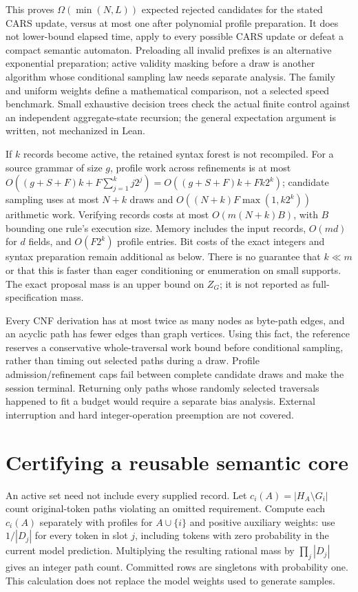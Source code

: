 \documentclass[11pt,a4paper]{article}
\begin{document}
This proves $\Omega(\min(N,L))$ expected rejected candidates for the stated
CARS update, versus at most one after polynomial profile preparation. It
does not lower-bound elapsed time, apply to every possible CARS update or
defeat a compact semantic automaton. Preloading all invalid prefixes is an
alternative exponential preparation; active validity masking before a draw
is another algorithm whose conditional sampling law needs separate analysis.
The family and uniform weights define a mathematical comparison, not a
selected speed benchmark. Small exhaustive decision trees check the actual
finite control against an independent aggregate-state recursion; the general
expectation argument is written, not mechanized in Lean.

If $k$ records become active, the retained syntax forest is not recompiled.
For a source grammar of size $g$, profile work across refinements is at most
$O((g+S+F)k+F\sum_{j=1}^k j2^j)=O((g+S+F)k+Fk2^k)$;
candidate sampling uses at most $N+k$ draws and
$O((N+k)F\max(1,k2^k))$ arithmetic work. Verifying records costs at most
$O(m(N+k)B)$, with $B$ bounding one rule's execution size. Memory includes
the input records, $O(md)$ for $d$ fields, and $O(F2^k)$ profile entries.
Bit costs of the exact integers and syntax preparation remain additional as
below. There is no guarantee that $k\ll m$ or that this is faster than eager
conditioning or enumeration on small supports. The exact proposal mass is
an upper bound on $Z_G$; it is not reported as full-specification mass.

Every CNF derivation has at most twice as many nodes as byte-path edges,
and an acyclic path has fewer edges than graph vertices. Using this fact,
the reference reserves a conservative whole-traversal work bound before
conditional sampling, rather than timing out selected paths during a draw.
Profile admission/refinement caps fail between complete candidate draws and
make the session terminal. Returning only paths whose randomly selected
traversals happened to fit a budget would require a separate bias analysis.
External interruption and hard integer-operation preemption are not covered.

\section{Certifying a reusable semantic core}
An active set need not include every supplied record. Let
$c_i(A)=|H_A\setminus G_i|$ count original-token paths violating an omitted
requirement. Compute each $c_i(A)$ separately with profiles for $A\cup\{i\}$
and positive auxiliary weights: use $1/|D_j|$ for every token in slot $j$,
including tokens with zero probability in the current model prediction.
Multiplying the resulting rational mass by $\prod_j|D_j|$ gives an integer
path count. Committed rows are singletons with probability one. This calculation
does not replace the model weights used to generate samples.
\end{document}
